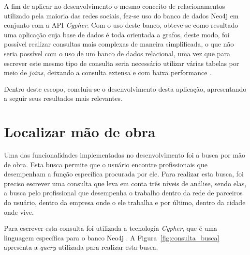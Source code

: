 \par A fim de aplicar no desenvolvimento o mesmo conceito de relacionamentos utilizado pela maioria das redes sociais, fez-se uso do banco de dados Neo4j em conjunto com a API \textit{Cypher}. Com o uso deste banco, obteve-se como resultado uma aplicação cuja base de dados é toda orientada a grafos, deste modo, foi possível realizar consultas mais complexas de maneira simplificada, o que não seria possível com o uso de um banco de dados relacional, uma vez que para escrever este mesmo tipo de consulta seria necessário utilizar várias tabelas por meio de \textit{joins}, deixando a consulta extensa e com baixa performance \cite{sadalage_fowler_nosql_distilled_brief_guide}.

\par Dentro deste escopo, concluiu-se o desenvolvimento desta aplicação, apresentando a seguir seus resultados mais relevantes.


\section{Localizar mão de obra}

\par Uma das funcionalidades implementadas no desenvolvimento foi a busca por mão de obra. Esta busca permite que o usuário encontre profissionais que desempenham a função específica procurada por ele. Para realizar esta busca, foi preciso escrever uma consulta que leva em conta três níveis de análise, sendo elas, a busca pelo profissional que desempenha o trabalho dentro da rede de parceiros do usuário, dentro da empresa onde o ele trabalha e por último, dentro da cidade onde vive.  

\par Para escrever esta consulta foi utilizada a tecnologia \textit{Cypher}, que é uma linguagem específica para o banco Neo4j \cite{neo4j_team_manual}. A Figura~\ref{fig:consulta_busca} apresenta a \textit{query} utilizada para realizar esta busca.

